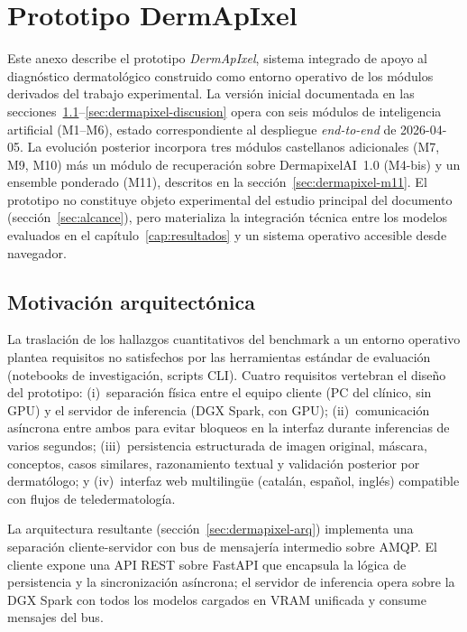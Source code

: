 
\chapter{Prototipo DermApIxel}
\label{cap:anexoh}

Este anexo describe el prototipo \emph{DermApIxel}, sistema
integrado de apoyo al diagnóstico dermatológico construido como
entorno operativo de los módulos derivados del trabajo
experimental. La versión inicial documentada en las
secciones~\ref{sec:dermapixel-motivacion}--\ref{sec:dermapixel-discusion}
opera con seis módulos de inteligencia artificial
(M1--M6), estado correspondiente al despliegue \emph{end-to-end}
de 2026-04-05. La evolución posterior incorpora tres módulos
castellanos adicionales (M7, M9, M10) más un módulo de
recuperación sobre DermapixelAI~1.0 (M4-bis) y un ensemble
ponderado (M11), descritos en la
secci\'on~\ref{sec:dermapixel-m11}. El prototipo no constituye
objeto experimental del estudio principal del documento
(secci\'on~\ref{sec:alcance}), pero materializa la integración
técnica entre los modelos evaluados en el
capítulo~\ref{cap:resultados} y un sistema operativo accesible
desde navegador.

\section{Motivación arquitectónica}
\label{sec:dermapixel-motivacion}

La traslación de los hallazgos cuantitativos del benchmark a un
entorno operativo plantea requisitos no satisfechos por las
herramientas estándar de evaluación (notebooks de investigación,
scripts CLI). Cuatro requisitos vertebran el diseño del prototipo:
(i)~separación física entre el equipo cliente (PC del clínico, sin
GPU) y el servidor de inferencia (DGX Spark, con GPU);
(ii)~comunicación asíncrona entre ambos para evitar bloqueos en la
interfaz durante inferencias de varios segundos; (iii)~persistencia
estructurada de imagen original, máscara, conceptos, casos
similares, razonamiento textual y validación posterior por
dermatólogo; y (iv)~interfaz web multilingüe (catalán, español,
inglés) compatible con flujos de teledermatología.

La arquitectura resultante (secci\'on~\ref{sec:dermapixel-arq}) implementa
una separación cliente-servidor con bus de mensajería intermedio
sobre AMQP. El cliente expone una API REST sobre FastAPI que
encapsula la lógica de persistencia y la sincronización
asíncrona; el servidor de inferencia opera sobre la DGX Spark con
todos los modelos cargados en VRAM unificada y consume mensajes
del bus.

